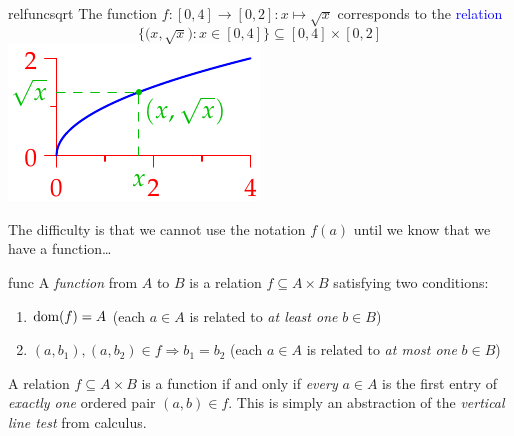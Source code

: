 \begin{example}[lower separated=false, sidebyside, sidebyside align=top seam, sidebyside gap=0pt, righthand width=0.3\linewidth]{}{relfuncsqrt}
	The function $f:[0,4]\to[0,2]:x\mapsto \sqrt x$ corresponds to the \textcolor{blue}{relation}
	\[
		\bigl\{\bigl(x,\sqrt x\bigr):x\in [0,4]\bigr\} \subseteq [0,4]\times [0,2]
	\]
	\tcblower
	\hfill
	\includegraphics{relations-20-reln3}
\end{example}

The difficulty is that we cannot use the notation $f(a)$ until we know that we have a function\ldots

\begin{defn}{}{func}
	A \emph{function} from $A$ to $B$ is a relation $f\subseteq A\times B$ satisfying two conditions:
	\begin{enumerate}
	  \item $\operatorname{dom}(f)=A$ \hfill (each $a\in A$ is related to \emph{at least one} $b\in B$)
	  \item $(a,b_1),(a,b_2)\in f\Longrightarrow b_1=b_2$ \hfill (each $a\in A$ is related to \emph{at most one} $b\in B$)
	\end{enumerate}
\end{defn}

A relation $f\subseteq A\times B$ is a function if and only if \emph{every} $a\in A$ is the first entry of \emph{exactly one} ordered pair $(a,b)\in f$. This is simply an abstraction of the \emph{vertical line test} from calculus.

